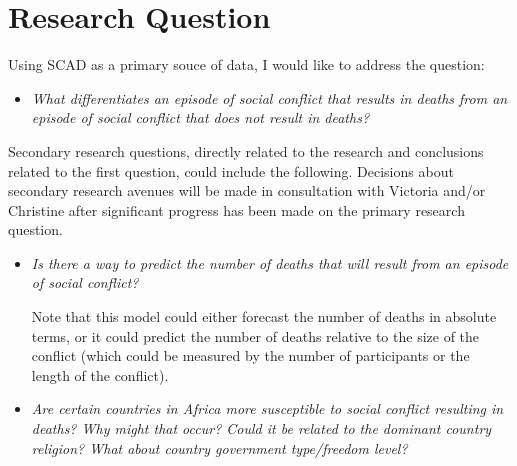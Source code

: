 \documentclass{article}
\begin{document}
\section{Research Question}
Using SCAD as a primary souce of data, I would like to address the question:

\begin{itemize}
\item[]\textit{What differentiates an episode of social conflict that results in deaths from an episode of social conflict that does not result in deaths?}
\end{itemize}

Secondary research questions, directly related to the research and conclusions related to the first question, could include the following.  Decisions about secondary research avenues will be made in consultation with Victoria and/or Christine after significant progress has been made on the primary research question.
\begin{itemize}
\item\textit{Is there a way to predict the number of deaths that will result from an episode of social conflict?}

Note that this model could either forecast the number of deaths in absolute terms, or it could predict the number of deaths relative to the size of the conflict (which could be measured by the number of participants or the length of the conflict).
\item\textit{Are certain countries in Africa more susceptible to social conflict resulting in deaths?  Why might that occur?  Could it be related to the dominant country religion?  What about country government type/freedom level?}
\end{itemize}
\end{document}
